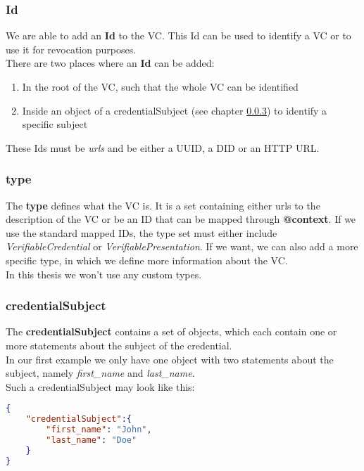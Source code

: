 \documentclass[
	a4paper               %
	,bibliography=totoc   %
	,listof=totoc         %
	,monolingual
]{bfhthesis}              %
\begin{document}
\subsubsection{Id}
We are able to add an \textbf{Id} to the VC. This Id can be used to identify a VC or to use it for revocation purposes.\\
There are two places where an \textbf{Id} can be added:
\begin{enumerate}
	\item In the root of the VC, such that the whole VC can be identified
	\item Inside an object of a credentialSubject (see chapter \ref{subsub:credentialsubject}) to identify a specific subject
\end{enumerate}

These Ids must be \textit{urls} and be either a UUID, a DID or an HTTP URL.

\subsubsection{type}

The \textbf{type} defines what the VC is. 
It is a set containing either urls to the description of the VC or be an ID that can be mapped through \textbf{@context}.
If we use the standard mapped IDs, the type set must either include \textit{VerifiableCredential} or \textit{VerifiablePresentation}.
If we want, we can also add a more specific type, in which we define more information about the VC.\\
In this thesis we won't use any custom types.

\subsubsection{credentialSubject}
\label{subsub:credentialsubject}
The \textbf{credentialSubject} contains a set of objects, which each contain one or more statements about the subject of the credential.\\
In our first example we only have one object with two statements about the subject, namely \textit{first\_name} and \textit{last\_name}.\\
Such a credentialSubject may look like this:
\begin{lstlisting}[language=json,firstnumber=1,caption={Example credentialSubject},captionpos=b]
{
	"credentialSubject":{
		"first_name": "John",
		"last_name": "Doe"
	}
}
\end{lstlisting}
\end{document}
